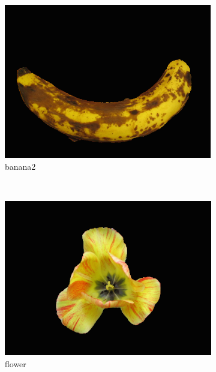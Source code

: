 \documentclass[10pt,twocolumn,letterpaper]{article}
\begin{document}
\begin{figure}[t]
        \begin{subfigure}[b]{0.15\textwidth}
                \includegraphics[width=\textwidth]{figures/UI_segmentation/banana2.png}
                \caption{banana2}
        \end{subfigure}%
        ~
        \begin{subfigure}[b]{0.15\textwidth}
                \includegraphics[width=\textwidth]{figures/UI_segmentation/flower.png}
                \caption{flower}
        \end{subfigure}%
        ~
        \begin{subfigure}[b]{0.15\textwidth}

\end{subfigure}
\end{figure}
\end{document}
